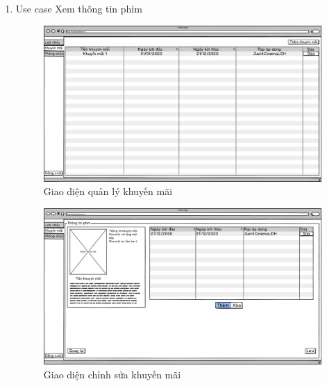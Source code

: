 \documentclass[a4paper, 12pt]{article}
\begin{document}
\begin{enumerate}
        \item Use case Xem thông tin phim
        \begin{figure}[H]
            \begin{center}
                \includegraphics[scale = 0.25]{Wireframe/Manager/Quản lý_Dashboard_Khuyến mãi.png}
                \caption{Giao diện quản lý khuyến mãi}
            \end{center}
        \end{figure}

        \begin{figure}[H]
            \begin{center}
                \includegraphics[scale = 0.25]{Wireframe/Manager/Quản lý_Dashboard_Sửa khuyến mãi.png}
                \caption{Giao diện chỉnh sửa khuyến mãi}
            \end{center}
        \end{figure}


\end{enumerate}
\end{document}
